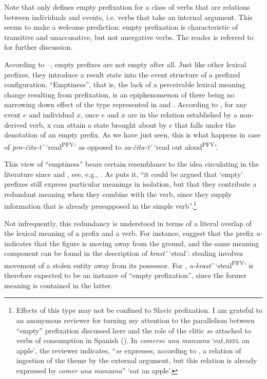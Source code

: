 \documentclass[output=paper,colorlinks,citecolor=brown]{langscibook}
\begin{document}
Note that  only defines empty prefixation for a class of verbs that are relations between individuals and events, i.e. verbs that take an internal argument. This seems to make a welcome prediction: empty prefixation is characteristic of transitive and unaccusative, but not unergative verbs. The reader is referred to \citet[ch. 4]{Romanova2007} for further discussion.

According to --, empty prefixes are not empty after all. Just like other lexical prefixes, they introduce a result state into the event structure of a prefixed configuration. “Emptiness”, that is, the lack of a perceivable lexical meaning change resulting from prefixation, is an epiphenomenon of there being no narrowing down effect of the type represented in  and . According to , for any event $e$ and individual $x$, once $e$ and $x$ are in the relation established by a non-derived verb, x can attain a state brought about by $e$ that falls under the denotation of an empty prefix. As we have just seen, this is what happens in case of \textit{pro-čita-t’} ‘read\textsuperscript{PFV}’ as opposed to \textit{za}-\textit{čita-t’} ‘read out aloud\textsuperscript{PFV}’.

This view of “emptiness” bears certain resemblance to the idea circulating in the literature since \citet{Vey1952} and \citet{Schooneveld1958}, see, e.g., \citet[][193--194]{Filip1999}. As \citet[177-178]{Gehrke2008} puts it, “it could be argued that ‘empty’ prefixes still express particular meanings in isolation, but that they contribute a redundant meaning when they combine with the verb, since they supply information that is already presupposed in the simple verb”.\footnote{Effects of this type may not be confined to Slavic prefixation. I am grateful to an anonymous reviewer for turning my attention to the parallelism between “empty” prefixation discussed here and the role of the clitic \textit{se} attached to verbs of consumption in Spanish (\citealt{Campanini.Schafer2011}). In \textit{comerse una manzana} `eat.\textsc{refl} an apple', the reviewer indicates, “\textit{se} expresses, according to \citet{Campanini.Schafer2011}, a relation of ingestion of the theme by the external argument, but this relation is already expressed by \textit{comer una manzana}” `eat an apple'.} 

Not infrequently, this redundancy is understood in terms of a literal overlap of the lexical meaning of a prefix and a verb. For instance, \citet{Janda.etal2013} suggest that the prefix \textit{u-} indicates that the figure is moving away from the ground, and the same meaning component can be found in the description of \textit{krast’} ‘steal’: stealing involves movement of a stolen entity away from its possessor. For \citeauthor{Janda.etal2013}, \textit{u-krast’} ‘steal\textsuperscript{PFV}’ is therefore expected to be an instance of “empty prefixation”, since the former meaning is contained in the latter. 
\end{document}

